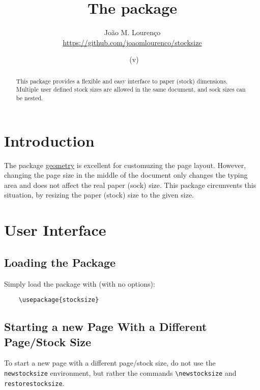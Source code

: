 \documentclass[12pt,a4paper,article]{article}
\begin{document}
 
  
  \title{The \textsf{\filename} package}
  \author{João M. Lourenço\\\url{https://github.com/joaomlourenco/stocksize}}
  \date{\filedate\ (v\fileversion)}
  
  \maketitle
  
  \begin{abstract}
    This package provides a flexible and easy interface to paper (stock) dimensions.
    Multiple user defined stock sizes are allowed in the same document, and sock sizes can be nested.
  \end{abstract}

\section{Introduction}
  
  The package 
    \href{https://github.com/davidcarlisle/geometry}{geometry} 
is excellent for customuzing the page layout.  However, changing the page size in the middle of the document only changes the typing area and does not affect the real paper (sock) size.  This package circunvents this situation, by resizing the paper (stock) size to the given size.

\section{User Interface}
  
\subsection{Loading the Package}
  
  Simply load the package with (with no options):
  
  \begin{verbatim}
    \usepackage{stocksize}
  \end{verbatim}
  
\subsection{Starting a new Page With a Different Page/Stock Size}
  
  To start a new page with a different page/stock size, do not use the \verb!newstocksize! environment, but rather the commands \verb!\newstocksize! and \verb!restorestocksize!.
  
\end{document}
